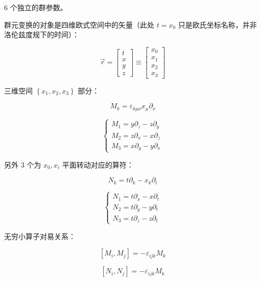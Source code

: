 $6$ 个独立的群参数。

群元变换的对象是四维欧式空间中的矢量（此处 $t=x_0$ 只是欧氏坐标名称，并非洛伦兹度规下的时间）：

\begin{equation}
\vec{r}
=\begin{bmatrix}
t \\
x \\
y \\
z
\end{bmatrix}
\equiv\begin{bmatrix}
x_0 \\
x_1 \\
x_2 \\
x_3
\end{bmatrix}
\end{equation}

三维空间 $\left\{x_1,x_2,x_3 \right\}$ 部分：

\begin{equation}
M_k
=\varepsilon_{k\mu\nu} x_\mu \partial_\nu
\end{equation}

\begin{equation}
\left\{
\begin{aligned}
M_1 = y\partial_z-z\partial_y \\
M_2 = z\partial_x-x\partial_z \\
M_3 = x\partial_y-y\partial_x
\end{aligned}
\right.
\end{equation}

另外 $3$ 个为 $x_0,x_i$ 平面转动对应的算符：

\begin{equation}
N_k
=t\partial_k-x_k\partial_t
\end{equation}

\begin{equation}
\left\{
\begin{aligned}
N_1 = t\partial_x-x\partial_t \\
N_2 = t\partial_y-y\partial_t \\
N_3 = t\partial_z-z\partial_t
\end{aligned}
\right.
\end{equation}

无穷小算子对易关系：

\begin{equation}
\left[M_i,M_j \right] = -\varepsilon_{ijk}M_k
\end{equation}

\begin{equation}
\left[N_i,N_j \right] = -\varepsilon_{ijk}M_k
\end{equation}

